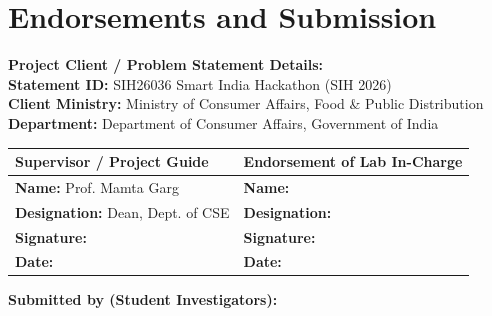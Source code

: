 \documentclass[11pt,a4paper]{article}
\begin{document}
\section{Endorsements and Submission}

\vspace{0.2cm}

\textbf{\large Project Client / Problem Statement Details:}\\
\textbf{Statement ID:} SIH26036 \textbar{} Smart India Hackathon (SIH 2026)\\
\textbf{Client Ministry:} Ministry of Consumer Affairs, Food \& Public Distribution\\
\textbf{Department:} Department of Consumer Affairs, Government of India

\vspace{0.6cm}

\begin{table}[htbp]
\centering
\renewcommand{\arraystretch}{1.5}
\begin{tabularx}{\textwidth}{|X|X|}
\hline
\textbf{\color{primarynavy}Supervisor / Project Guide} & \textbf{\color{primarynavy}Endorsement of Lab In-Charge} \\ \hline
\vspace{0.1cm}
\textbf{Name:} Prof. Mamta Garg & \vspace{0.1cm}\textbf{Name:} \hrulefill \\
\textbf{Designation:} Dean, Dept. of CSE & \textbf{Designation:} \hrulefill \\
\vspace{0.8cm}
\textbf{Signature:} \hrulefill & \vspace{0.8cm}\textbf{Signature:} \hrulefill \\
\textbf{Date:} \hrulefill & \textbf{Date:} \hrulefill \\ \hline
\end{tabularx}
\end{table}

\vspace{0.4cm}

\textbf{\large Submitted by (Student Investigators):}
\end{document}

